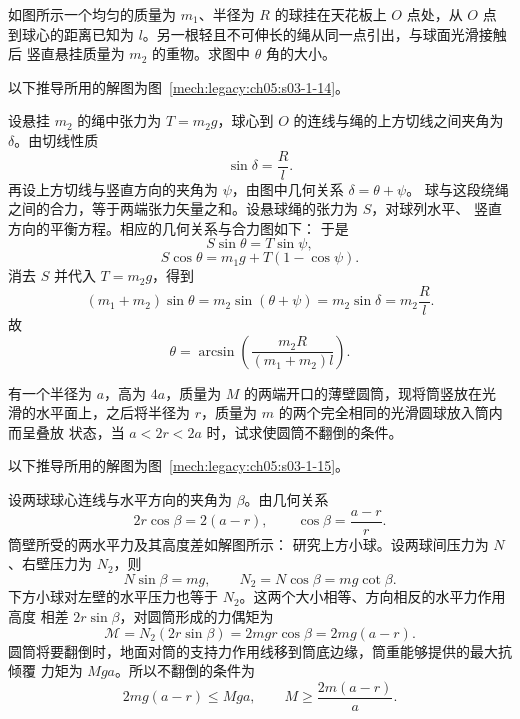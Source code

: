 {\begin{origexamplebox}{}\label{ch05:ex:s03-1-14}
如图所示一个均匀的质量为 $m_1$、半径为 $R$ 的球挂在天花板上 $O$ 点处，从 $O$ 点
到球心的距离已知为 $l$。另一根轻且不可伸长的绳从同一点引出，与球面光滑接触后
竖直悬挂质量为 $m_2$ 的重物。求图中 $\theta$ 角的大小。
\end{origexamplebox}

\begin{xesolution}
以下推导所用的解图为图~\ref{mech:legacy:ch05:s03-1-14}。

设悬挂 $m_2$ 的绳中张力为 $T=m_2g$，球心到 $O$ 的连线与绳的上方切线之间夹角为
$\delta$。由切线性质
\[
  \sin\delta=\frac{R}{l}.
\]
再设上方切线与竖直方向的夹角为 $\psi$，由图中几何关系 $\delta=\theta+\psi$。
球与这段绕绳之间的合力，等于两端张力矢量之和。设悬球绳的张力为 $S$，对球列水平、
竖直方向的平衡方程。相应的几何关系与合力图如下：
\soldiagOneFourteen
于是
\[
  S\sin\theta=T\sin\psi,
\]
\[
  S\cos\theta=m_1g+T(1-\cos\psi).
\]
消去 $S$ 并代入 $T=m_2g$，得到
\[
  (m_1+m_2)\sin\theta
  =m_2\sin(\theta+\psi)
  =m_2\sin\delta
  =m_2\frac{R}{l}.
\]
故
\[
  \boxed{\theta=\arcsin\!\left(\frac{m_2R}{(m_1+m_2)l}\right)}.
\]
\end{xesolution}

\begin{origexamplebox}{}\label{ch05:ex:s03-1-15}
有一个半径为 $a$，高为 $4a$，质量为 $M$ 的两端开口的薄壁圆筒，现将筒竖放在光
滑的水平面上，之后将半径为 $r$，质量为 $m$ 的两个完全相同的光滑圆球放入筒内而呈叠放
状态，当 $a<2r<2a$ 时，试求使圆筒不翻倒的条件。
\end{origexamplebox}

\begin{xesolution}
以下推导所用的解图为图~\ref{mech:legacy:ch05:s03-1-15}。

设两球球心连线与水平方向的夹角为 $\beta$。由几何关系
\[
  2r\cos\beta=2(a-r),
  \qquad
  \cos\beta=\frac{a-r}{r}.
\]
筒壁所受的两水平力及其高度差如解图所示：
\soldiagOneFifteen
研究上方小球。设两球间压力为 $N$、右壁压力为 $N_2$，则
\[
  N\sin\beta=mg,
  \qquad
  N_2=N\cos\beta=mg\cot\beta.
\]
下方小球对左壁的水平压力也等于 $N_2$。这两个大小相等、方向相反的水平力作用高度
相差 $2r\sin\beta$，对圆筒形成的力偶矩为
\[
  \mathcal M=N_2(2r\sin\beta)
  =2mgr\cos\beta=2mg(a-r).
\]
圆筒将要翻倒时，地面对筒的支持力作用线移到筒底边缘，筒重能够提供的最大抗倾覆
力矩为 $Mga$。所以不翻倒的条件为
\[
  2mg(a-r)\le Mga,
  \qquad
  \boxed{M\ge \frac{2m(a-r)}{a}}.
\]
\end{xesolution}

}

